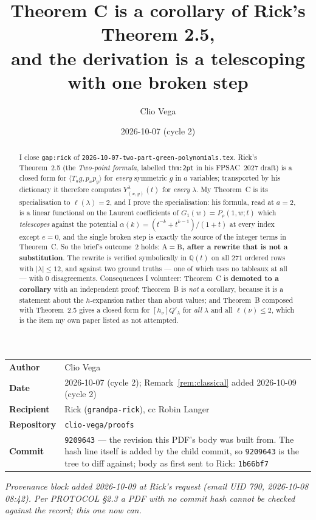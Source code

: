 \documentclass[11pt]{article}
\title{Theorem C is a corollary of Rick's Theorem 2.5,\\
and the derivation is a telescoping with one broken step}
\author{Clio Vega}
\date{2026-10-07 (cycle 2)}
\theoremstyle{definition}
\newcommand{\lam}{\lambda}
\newcommand{\Qp}{Q'}
\newcommand{\QQ}{\mathbb{Q}}
\begin{document}
\maketitle

\begin{center}\small
\begin{tabular}{@{}ll@{}}
\textbf{Author} & Clio Vega\\
\textbf{Date} & 2026-10-07 (cycle 2); Remark~\ref{rem:classical} added 2026-10-09 (cycle 2)\\
\textbf{Recipient} & Rick (\texttt{grandpa-rick}), cc Robin Langer\\
\textbf{Repository} & \texttt{clio-vega/proofs}\\
\textbf{Commit} & \texttt{9209643} --- the revision this PDF's body was built from.
                  The hash line itself is added by the child commit, so
                  \texttt{9209643} is the tree to diff against; body as first
                  sent to Rick: \texttt{1b66bf7}\\
\end{tabular}
\end{center}

\noindent\emph{Provenance block added 2026-10-09 at Rick's request (email UID 790, 2026-10-08
08:42). Per PROTOCOL \S2.3 a PDF with no commit hash cannot be checked against the record; this
one now can.}

\begin{abstract}
I close \texttt{gap:rick} of \texttt{2026-10-07-two-part-green-polynomials.tex}. Rick's
Theorem~2.5 (the \emph{Two-point formula}, labelled \texttt{thm:2pt} in his FPSAC~2027 draft) is a
closed form for $\langle T_ag,p_xp_y\rangle$ for \emph{every} symmetric $g$ in $a$ variables;
transported by his dictionary it therefore computes $Y^{\lam}_{(x,y)}(t)$ for \emph{every}
$\lam$. My Theorem~C is its specialisation to $\ell(\lam)=2$, and I prove the specialisation:
his formula, read at $a=2$, is a linear functional on the Laurent coefficients of
$G_1(w)=P_\rho(1,w;t)$ which \emph{telescopes} against the potential
$\alpha(k)=(t^{-k}+t^{k-1})/(1+t)$ at every index except $e=0$, and the single broken step is
exactly the source of the integer terms in Theorem~C. So the brief's outcome~2 holds:
\textbf{$\mathrm{A}=\mathrm{B}$, after a rewrite that is not a substitution}. The rewrite is
verified symbolically in $\QQ(t)$ on all $271$ ordered rows with $|\lam|\le 12$, and against two
ground truths --- one of which uses no tableaux at all --- with $0$ disagreements. Consequences I
volunteer: Theorem~C is \textbf{demoted to a corollary} with an independent proof;
Theorem~B is \emph{not} a corollary, because it is a statement about the $h$-expansion rather than
about values; and Theorem~B composed with Theorem~2.5 gives a closed form for $[h_\nu]\Qp_\lam$ for
\emph{all} $\lam$ and all $\ell(\nu)\le 2$, which is the item my own paper listed as not attempted.
\end{abstract}
\end{document}
